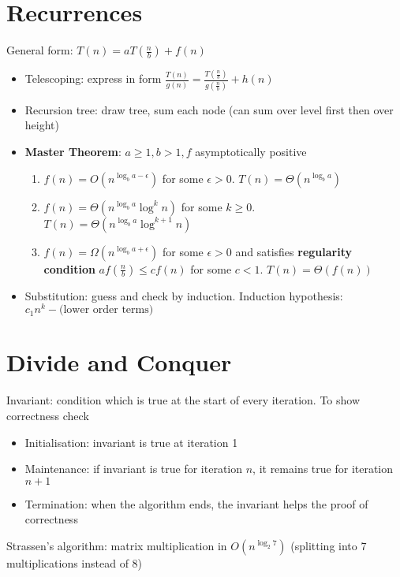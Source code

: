 \documentclass[11pt]{article}
\theoremstyle{remark}
\begin{document}
\section{Recurrences}
General form: $T(n)=aT(\frac{n}{b})+f(n)$
\begin{itemize}
    \item Telescoping: express in form $\frac{T(n)}{g(n)}=\frac{T(\frac{n}{b})}{g(\frac{n}{b})}+h(n)$ 
    \item Recursion tree: draw tree, sum each node (can sum over level first then over height)
    \item \textbf{Master Theorem}: $a\geq 1,b>1,f$ asymptotically positive
        \begin{enumerate}
            \item $f(n)=O(n^{\log_b a-\epsilon})$ for some  $\epsilon>0$.  $T(n)=\Theta(n^{\log_b a})$
            \item  $f(n)=\Theta(n^{\log_b a}\log^k n)$ for some  $k\geq 0$.  $T(n)=\Theta(n^{\log_b
                a}\log^{k+1}n)$
            \item  $f(n)=\Omega(n^{\log_b a+\epsilon})$ for some  $\epsilon>0$ and satisfies
                \textbf{regularity condition}  $af(\frac{n}{b})\leq cf(n)$ for some $c<1$.
                $T(n)=\Theta(f(n))$
        \end{enumerate}
    \item Substitution: guess and check by induction. Induction hypothesis: $c_1n^k-\text{(lower order
        terms)}$
\end{itemize}
\section{Divide and Conquer}
Invariant: condition which is true at the start of every iteration. To show correctness check
\begin{itemize}
    \item Initialisation: invariant is true at iteration 1
    \item Maintenance: if invariant is true for iteration $n$, it remains true for iteration $n+1$ 
    \item Termination: when the algorithm ends, the invariant helps the proof of correctness
\end{itemize}
Strassen's algorithm: matrix multiplication in $O(n^{\log_2 7})$ (splitting into 7 multiplications instead
of 8)
\end{document}
